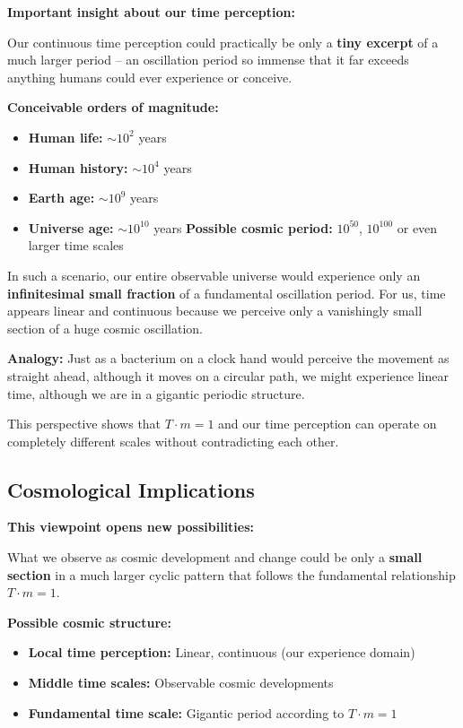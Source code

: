 	\textbf{Important insight about our time perception:}
	
	Our continuous time perception could practically be only a \textbf{tiny excerpt} of a much larger period -- an oscillation period so immense that it far exceeds anything humans could ever experience or conceive.
	
	\textbf{Conceivable orders of magnitude:}
	\begin{itemize}
		\item \textbf{Human life:} $\sim 10^2$ years
		\item \textbf{Human history:} $\sim 10^4$ years
		\item \textbf{Earth age:} $\sim 10^9$ years
		\item \textbf{Universe age:} $\sim 10^{10}$ years
		\textbf{Possible cosmic period:} $10^{50}$, $10^{100}$ or even larger time scales
	\end{itemize}
	
	In such a scenario, our entire observable universe would experience only an \textbf{infinitesimal small fraction} of a fundamental oscillation period. For us, time appears linear and continuous because we perceive only a vanishingly small section of a huge cosmic \glqq oscillation\grqq.
	
	\textbf{Analogy:} Just as a bacterium on a clock hand would perceive the movement as \glqq straight ahead\grqq, although it moves on a circular path, we might experience \glqq linear time\grqq, although we are in a gigantic periodic structure.
	
	This perspective shows that $T \cdot m = 1$ and our time perception can operate on completely different scales without contradicting each other.
	
	\subsection{Cosmological Implications}
	
	\textbf{This viewpoint opens new possibilities:}
	
	What we observe as cosmic development and change could be only a \textbf{small section} in a much larger cyclic pattern that follows the fundamental relationship $T \cdot m = 1$.
	
	\textbf{Possible cosmic structure:}
	\begin{itemize}
		\item \textbf{Local time perception:} Linear, continuous (our experience domain)
		\item \textbf{Middle time scales:} Observable cosmic developments
		\item \textbf{Fundamental time scale:} Gigantic period according to $T \cdot m = 1$
	\end{itemize}
	
